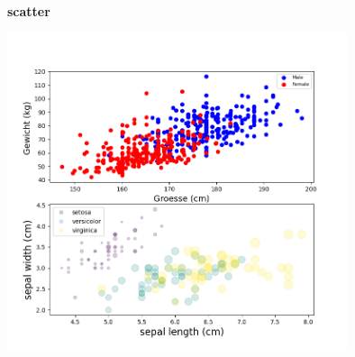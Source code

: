 \newpage
\textbf{scatter}
\\[0.1cm]
\begin{minipage}[h]{10cm}
	
\end{minipage}
\begin{minipage}[h]{8cm}
	\includegraphics[width=10cm,align=t]{pics/Matplotlib/Scatter.png}
\end{minipage}
